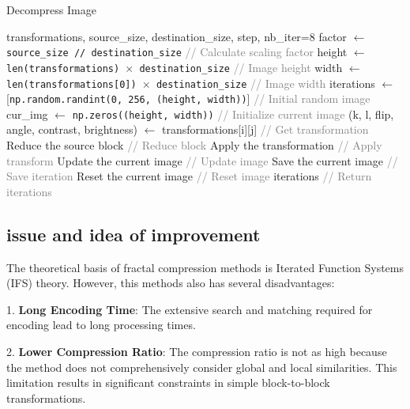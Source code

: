 \documentclass{article}
\begin{document}
\begin{algorithm}
\caption{Decompress Image}
\begin{algorithmic}[1]
\REQUIRE transformations, source\_size, destination\_size, step, nb\_iter=8
\STATE factor $\gets$ \texttt{source\_size // destination\_size} \textcolor{gray}{// Calculate scaling factor}
\STATE height $\gets$ \texttt{len(transformations) $\times$ destination\_size} \textcolor{gray}{// Image height}
\STATE width $\gets$ \texttt{len(transformations[0]) $\times$ destination\_size} \textcolor{gray}{// Image width}
\STATE iterations $\gets$ [\texttt{np.random.randint(0, 256, (height, width))}] \textcolor{gray}{// Initial random image}
\STATE cur\_img $\gets$ \texttt{np.zeros((height, width))} \textcolor{gray}{// Initialize current image}
            \STATE (k, l, flip, angle, contrast, brightness) $\gets$ transformations[i][j] \textcolor{gray}{// Get transformation}
            \STATE Reduce the source block \textcolor{gray}{// Reduce block}
            \STATE Apply the transformation \textcolor{gray}{// Apply transform}
            \STATE Update the current image \textcolor{gray}{// Update image}
        \ENDFOR
    \ENDFOR
    \STATE Save the current image \textcolor{gray}{// Save iteration}
    \STATE Reset the current image \textcolor{gray}{// Reset image}
\ENDFOR
\RETURN iterations \textcolor{gray}{// Return iterations}
\end{algorithmic}
\end{algorithm}


\subsection{issue and idea of improvement}

The theoretical basis of fractal compression methods is Iterated Function Systems (IFS) theory. However, this methods also has several disadvantages:

1. \textbf{Long Encoding Time}: The extensive search and matching required for encoding lead to long processing times.

2. \textbf{Lower Compression Ratio}: The compression ratio is not as high because the method does not comprehensively consider global and local similarities. This limitation results in significant constraints in simple block-to-block transformations.
\end{document}
